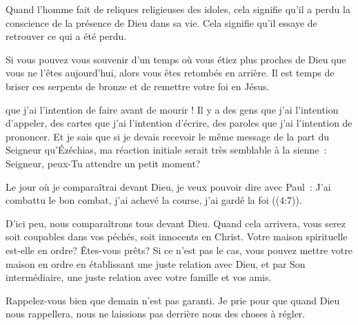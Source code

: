 Quand l'homme fait de reliques religieuses des idoles,
 cela signifie qu'il a perdu la conscience de la présence de Dieu dans sa vie.
 Cela signifie qu'il essaye de retrouver ce qui a été perdu. 


Si vous pouvez vous souvenir d'un temps où vous étiez plus proches de Dieu
 que vous ne l'êtes aujourd'hui, alors vous êtes retombés en arrière.
 Il est temps de briser ces serpents de bronze et de remettre votre foi en Jésus. 

\dvrule






 que j'ai l'intention de faire
 avant de mourir ! Il y a des gens que j'ai l'intention d'appeler,
 des cartes que j'ai l'intention d'écrire, des paroles que j'ai l'intention
 de prononcer. Et je sais que si je devais recevoir le même message
 de la part du Seigneur qu'Ézéchias, ma réaction initiale serait très semblable
 à la sienne~: \og Seigneur, peux-Tu attendre un petit moment? \fg{}


Le jour où je comparaîtrai devant Dieu, je veux pouvoir dire avec Paul~:
 \og J'ai combattu le bon combat, j'ai achevé la course,
 j'ai gardé la foi \fg{} ((4:7)). 

D'ici peu, nous comparaîtrons tous devant Dieu. Quand cela arrivera,
 vous serez soit coupables dans vos péchés, soit innocents en Christ.
 Votre maison spirituelle est-elle en ordre? Êtes-vous prêts?
 Si ce n'est pas le cas, vous pouvez mettre votre maison en ordre
 en établissant une juste relation avec Dieu, et par Son intermédiaire,
 une juste relation avec votre famille et vos amis. 

Rappelez-vous bien que demain n'est pas garanti. Je prie pour que quand Dieu
 nous rappellera, nous ne laissions pas derrière nous des choses à régler. 

